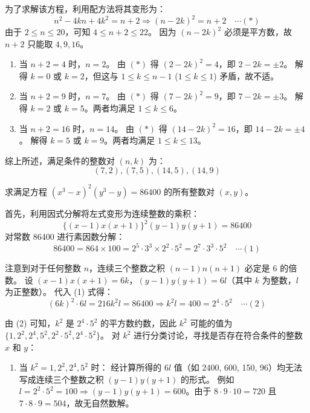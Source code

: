 \begin{questions}
\begin{solution}
    为了求解该方程，利用配方法将其变形为：
    \[ n^2 - 4kn + 4k^2 = n + 2 \Rightarrow (n-2k)^2 = n+2 \quad \cdots (*)  \]
    由于 $2 \le n \le 20$，可知 $4 \le n+2 \le 22$。
    因为 $(n-2k)^2$ 必须是平方数，故 $n+2$ 只能取 $4, 9, 16$。

    \begin{enumerate}
        \item 当 $n+2 = 4$ 时，$n=2$。
        由 $(*)$ 得 $(2-2k)^2 = 4$，即 $2-2k = \pm 2$。
        解得 $k=0$ 或 $k=2$，但这与 $1 \le k \le n-1$ ($1 \le k \le 1$) 矛盾，故不适。

        \item 当 $n+2 = 9$ 时，$n=7$。
        由 $(*)$ 得 $(7-2k)^2 = 9$，即 $7-2k = \pm 3$。
        解得 $k=2$ 或 $k=5$。两者均满足 $1 \le k \le 6$。

        \item 当 $n+2 = 16$ 时，$n=14$。
        由 $(*)$ 得 $(14-2k)^2 = 16$，即 $14-2k = \pm 4$。
        解得 $k=5$ 或 $k=9$。两者均满足 $1 \le k \le 13$。
    \end{enumerate}

    综上所述，满足条件的整数对 $(n, k)$ 为：
    \[ (7, 2), (7, 5), (14, 5), (14, 9)  \]
\end{solution}

\question
求满足方程 $(x^3 - x)^2 (y^3 - y) = 86400$ 的所有整数对 $(x, y)$。

\begin{solution}
    首先，利用因式分解将左式变形为连续整数的乘积：
    \[ \{(x-1)x(x+1)\}^2 (y-1)y(y+1) = 86400  \]
    对常数 86400 进行素因数分解：
    \[ 86400 = 864 \times 100 = 2^5 \cdot 3^3 \times 2^2 \cdot 5^2 = 2^7 \cdot 3^3 \cdot 5^2 \quad \cdots (1)  \]
    
    注意到对于任何整数 $n$，连续三个整数之积 $(n-1)n(n+1)$ 必定是 $6$ 的倍数。
    设 $(x-1)x(x+1) = 6k$，$(y-1)y(y+1) = 6l$（其中 $k$ 为整数，$l$ 为正整数）。
    代入 (1) 式得：
    \[ (6k)^2 \cdot 6l = 216 k^2 l = 86400 \Rightarrow k^2 l = 400 = 2^4 \cdot 5^2 \quad \cdots (2)  \]
    
    由 (2) 可知，$k^2$ 是 $2^4 \cdot 5^2$ 的平方数约数，因此 $k^2$ 可能的值为 $\{1, 2^2, 2^4, 5^2, 2^2 \cdot 5^2, 2^4 \cdot 5^2\}$。
    对 $k^2$ 进行分类讨论，寻找是否存在符合条件的整数 $x$ 和 $y$：

    \begin{enumerate}
        \item 当 $k^2 = 1, 2^2, 2^4, 5^2$ 时：
        经计算所得的 $6l$ 值（如 2400, 600, 150, 96）均无法写成连续三个整数之积 $(y-1)y(y+1)$ 的形式。
        例如 $l = 2^2 \cdot 5^2 = 100 \Rightarrow (y-1)y(y+1) = 600$。由于 $8 \cdot 9 \cdot 10 = 720$ 且 $7 \cdot 8 \cdot 9 = 504$，故无自然数解。


\end{enumerate}
\end{solution}
\end{questions}
